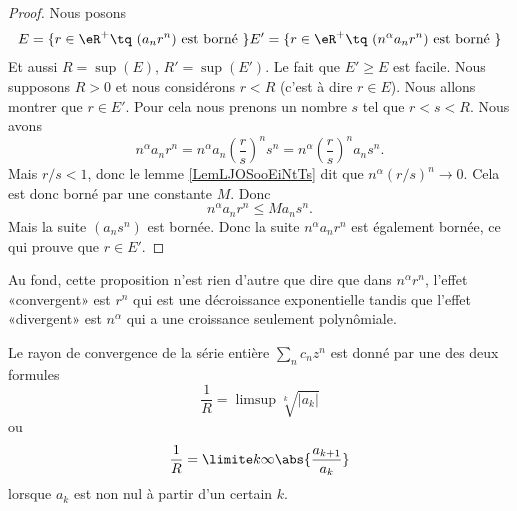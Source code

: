 \begin{proof}
    Nous posons
    \begin{subequations}
        \begin{align}
            E=\{ r\in \eR^+\tq \text{  } (a_nr^n)\text{ est borné } \}
            E'=\{ r\in \eR^+\tq \text{  } (n^{\alpha}a_nr^n)\text{ est borné } \}
        \end{align}
    \end{subequations}
    Et aussi \( R=\sup(E)\), \( R'=\sup(E')\). Le fait que \( E'\geq E\) est facile. Nous supposons \( R>0\) et nous considérons \( r<R\) (c'est à dire \( r\in E\)).  Nous allons montrer que \( r\in E'\). Pour cela nous prenons un nombre \( s\) tel que \( r<s<R\). Nous avons
    \begin{equation}
        n^{\alpha}a_nr^n=n^{\alpha}a_n\left( \frac{ r }{ s } \right)^ns^n=n^{\alpha}\left( \frac{ r }{ s } \right)^na_ns^n.
    \end{equation}
    Mais \( r/s<1\), donc le lemme \ref{LemLJOSooEiNtTs} dit que \( n^{\alpha}(r/s)^n\to 0\). Cela est donc borné par une constante \( M\). Donc
    \begin{equation}
        n^{\alpha}a_nr^n\leq Ma_ns^n.
    \end{equation}
    Mais la suite \( (a_ns^n)\) est bornée. Donc la suite \( n^{\alpha}a_nr^n\) est également bornée, ce qui prouve que \( r\in E'\).
\end{proof}

\begin{remark}
    Au fond, cette proposition n'est rien d'autre que dire que dans \( n^\alpha r^n\), l'effet «convergent» est \( r^n\) qui est une décroissance exponentielle tandis que l'effet «divergent» est \( n^{\alpha}\) qui a une croissance seulement polynômiale.
\end{remark}

\begin{theorem}		\label{ThoSerPuissRap}
Le rayon de convergence de la série entière \( \sum_n c_n z^n\) est donné par une des deux formules
\begin{equation}		\label{EqRayCOnvSer}
	\frac{1}{ R } =\limsup\sqrt[k]{| a_k |}
\end{equation}
ou
\begin{equation}		\label{EqAlphaSerPuissAtern}
	\frac{1}{ R }=\limite k \infty \abs{\frac{a_{k+1}}{a_k}}
\end{equation}
lorsque $a_k$ est non nul à partir d'un certain $k$.
\end{theorem}

